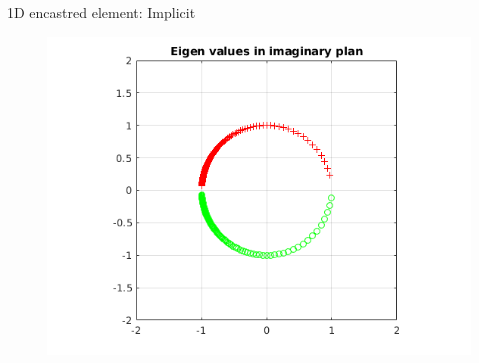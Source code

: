 \begin{frame}{1D encastred element: Implicit}
\begin{figure}[ht] 
  \label{ fig7} 
  \begin{minipage}[b]{0.5\linewidth}
    \centering
    \includegraphics[scale=.35]{images/enc-imp-1.png} \\


\end{minipage}
\end{figure}
\end{frame}
